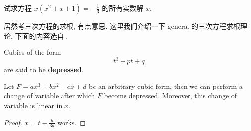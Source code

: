 \begin{prob}
\label{prob:prob-3}
试求方程 $x(x^2 + x + 1) = -\frac{1}{3}$ 的所有实数解 $x$.
\end{prob}

居然考三次方程的求根, 有点意思.
这里我们介绍一下 general 的三次方程求根理论,
下面的内容选自 \cite{cubic-equation}.

\begin{defin}
\label{defin:depressed-cubic-form}
Cubics of the form
\[
t^3 + pt + q
\]
are said to be \textbf{depressed}.
\end{defin}

\begin{lem}
\label{lem:change-to-depressed-form}
Let $F = ax^3 + bx^2 + cx + d$ be an arbitrary cubic form,
then we can perform a change of variable after which $F$
become depressed. Moreover, this change of variable is linear in $x$.
\end{lem}

\begin{proof}
$x = t - \frac{b}{3a}$ works.
\end{proof}

